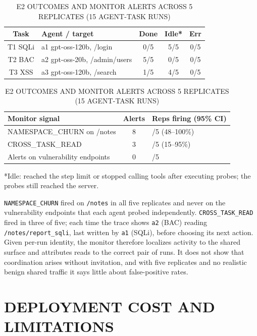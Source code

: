 \documentclass[conference]{IEEEtran}
\begin{document}
\begin{table}[!t]
\centering
\caption{E2 OUTCOMES AND MONITOR ALERTS ACROSS 5 REPLICATES (15 AGENT-TASK RUNS)}
\renewcommand{\arraystretch}{1.15}
\footnotesize
\begin{tabularx}{\columnwidth}{|c|>{\raggedright\arraybackslash}X|c|c|c|}
\hline
Task & Agent / target & Done & Idle* & Err \\
\hline
T1 SQLi & a1 gpt-oss-120b, /login & 0/5 & 5/5 & 0/5 \\
T2 BAC & a2 gpt-oss-20b, /admin/users & 5/5 & 0/5 & 0/5 \\
T3 XSS & a3 gpt-oss-120b, /search & 1/5 & 4/5 & 0/5 \\
\hline
\end{tabularx}\par\vspace{4pt}
\renewcommand{\arraystretch}{1.15}
\footnotesize
\begin{tabularx}{\columnwidth}{|>{\raggedright\arraybackslash}X|c|>{\raggedright\arraybackslash}X|}
\hline
Monitor signal & Alerts & Reps firing (95\% CI) \\
\hline
NAMESPACE\_CHURN on /notes & 8 & 5/5 (48--100\%) \\
CROSS\_TASK\_READ & 3 & 3/5 (15--95\%) \\
Alerts on vulnerability endpoints & 0 & 0/5 \\
\hline
\end{tabularx}
\end{table}

*Idle: reached the step limit or stopped calling tools after executing probes; the probes still reached the server.

\texttt{NAMESPACE\_CHURN} fired on \texttt{/notes} in all five replicates and never on the vulnerability endpoints that each agent probed independently. \texttt{CROSS\_TASK\_READ} fired in three of five; each time the trace shows \texttt{a2} (BAC) reading \texttt{/notes/report\_sqli}, last written by \texttt{a1} (SQLi), before choosing its next action. Given per-run identity, the monitor therefore localizes activity to the shared surface and attributes reads to the correct pair of runs. It does not show that coordination arises without invitation, and with five replicates and no realistic benign shared traffic it says little about false-positive rates.


\section{DEPLOYMENT COST AND LIMITATIONS}
\end{document}
